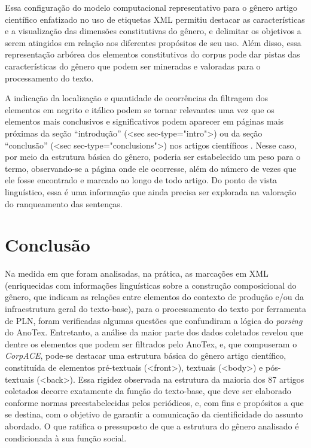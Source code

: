 \documentclass[portuguese]{textolivre}
\begin{document}

Essa configuração do modelo computacional representativo para o gênero artigo científico enfatizado no uso de etiquetas XML permitiu destacar as características e a visualização das dimensões constitutivas do gênero, e delimitar os objetivos a serem atingidos em relação aos diferentes propósitos de seu uso. Além disso, essa representação arbórea dos elementos constitutivos do corpus pode dar pistas das características do gênero que podem ser mineradas e valoradas para o processamento do texto.

A indicação da localização e quantidade de ocorrências da filtragem dos elementos em negrito e itálico podem se tornar relevantes uma vez que os elementos mais conclusivos e significativos podem aparecer em páginas mais próximas da seção “introdução” (<sec sec-type="intro">) ou da seção “conclusão” (<sec sec-type="conclusions">) nos artigos científicos \cite{lin_identifying_1997}. Nesse caso, por meio da estrutura básica do gênero, poderia ser estabelecido um peso para o termo, observando-se a página onde ele ocorresse, além do número de vezes que ele fosse encontrado e marcado ao longo de todo artigo. Do ponto de vista linguístico, essa é uma informação que ainda precisa ser explorada na valoração do ranqueamento das sentenças.

\section{Conclusão}\label{sec-links}
Na medida em que foram analisadas, na prática, as marcações em XML (enriquecidas com informações linguísticas sobre a construção composicional do gênero, que indicam as relações entre elementos do contexto de produção e/ou da infraestrutura geral do texto-base), para o processamento do texto por ferramenta de PLN, foram verificadas algumas questões que confundiram a lógica do \textit{parsing} do AnoTex. Entretanto, a análise da maior parte dos dados coletados revelou que dentre os elementos que podem ser filtrados pelo AnoTex, e, que compuseram o \textit{CorpACE}, pode-se destacar uma estrutura básica do gênero artigo científico, constituída de elementos pré-textuais (<front>), textuais (<body>) e pós-textuais (<back>). Essa rigidez observada na estrutura da maioria dos 87 artigos coletados decorre exatamente da função do texto-base, que deve ser elaborado conforme normas preestabelecidas pelos periódicos, e, com fins e propósitos a que se destina, com o objetivo de garantir a comunicação da cientificidade do assunto abordado. O que ratifica o pressuposto de que a estrutura do gênero analisado é condicionada à sua função social.
\end{document}

